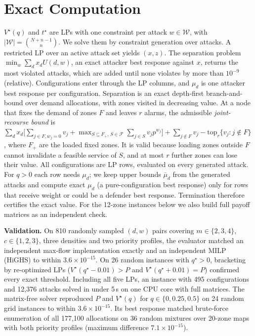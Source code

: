 \documentclass[10pt,twocolumn,letterpaper]{article}
\theoremstyle{remark}
\newcommand{\W}{\mathcal{W}}
\begin{document}
\section{Exact Computation}\label{sec:alg}
$V^\star(q)$ and $t^\star$ are LPs with one constraint per attack $w\in\W$, with $|\W|=\binom{N+n-1}{n}$. We solve them by constraint generation over attacks. A restricted LP over an active attack set yields $(x,z)$. The separation problem $\min_w\sum_dx_dU(d,w)$, an exact attacker best response against $x$, returns the most violated attacks, which are added until none violates by more than $10^{-9}$ (relative). Configurations enter through the LP columns, and $\mu_d$ is one attacker best response per configuration. Separation is an exact depth-first branch-and-bound over demand allocations, with zones visited in decreasing value. At a node that fixes the demand of zones $F$ and leaves $r$ alarms, the admissible \emph{joint-recourse bound} is $\sum_d x_d\big[\sum_{j\in F,w_j=0}v_j+\max_{S\subseteq F_+,\,S\in\mathcal{F}}\sum_{j\in S}v_jp^{w_j}\big]+\sum_{j\notin F}v_j-\mathrm{top}_r\{v_j:j\notin F\}$, where $F_+$ are the loaded fixed zones. It is valid because loading zones outside $F$ cannot invalidate a feasible service of $S$, and at most $r$ further zones can lose their value. All configurations are LP rows, evaluated on every generated attack. For $q>0$ each row needs $\mu_d$; we keep upper bounds $\bar\mu_d$ from the generated attacks and compute exact $\mu_d$ (a pure-configuration best response) only for rows that receive weight or could be a defender best response. Termination therefore certifies the exact value. For the 12-zone instances below we also build full payoff matrices as an independent check.

\textbf{Validation.} On 810 randomly sampled $(d,w)$ pairs covering $m\in\{2,3,4\}$, $c\in\{1,2,3\}$, three densities and two priority profiles, the evaluator matched an independent max-flow implementation exactly and an independent MILP (HiGHS) to within $3.6\times10^{-15}$. On 26 random instances with $q^\star>0$, bracketing by re-optimized LPs ($V^\star(q^\star-0.01)>P$ and $V^\star(q^\star+0.01)=P$) confirmed every exact threshold. Including all five LPs, an instance with 495 configurations and 12{,}376 attacks solved in under 5\,s on one CPU core with full matrices. The matrix-free solver reproduced $P$ and $V^\star(q)$ for $q\in\{0,0.25,0.5\}$ on 24 random grid instances to within $3.6\times10^{-15}$. Its best response matched brute-force enumeration of all 177{,}100 allocations on 36 random mixtures over 20-zone maps with both priority profiles (maximum difference $7.1\times10^{-15}$).
\end{document}
